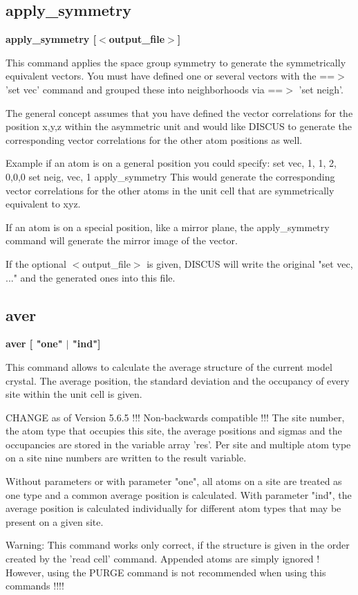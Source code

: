 \subsection*{apply\_symmetry}
{\bf apply\_symmetry [$ <$output\_file$> $] \par }
\par
\vspace{3pt}
This command applies the space group symmetry to generate the 
symmetrically equivalent vectors. You must have defined one or 
several vectors with the ==$> $ 'set vec' command and grouped 
these into neighborhoods via ==$> $ 'set neigh'. 
\par
The general concept assumes that you have defined the vector 
correlations for the position x,y,z within the asymmetric unit 
and would like DISCUS to generate the corresponding vector 
correlations for the other atom positions as well. 
\par
Example if an atom is on a general position you could specify: 
set vec, 1,  1, 2, 0,0,0 
set neig, vec, 1 
apply\_symmetry 
This would generate the corresponding vector correlations for 
the other atoms in the unit cell that are symmetrically 
equivalent to xyz. 
\par
If an atom is on a special position, like a mirror plane, the 
apply\_symmetry command will generate the mirror image of the 
vector. 
\par
\par
If the optional $ <$output\_file$> $ is given, DISCUS will write the 
original "set vec, ..." and the generated ones into this file. 
\subsection*{aver}
{\bf aver [ "one" $| $ "ind"] \par }
\par
\vspace{3pt}
This command allows to calculate the average structure of the current 
model crystal. The average position, the standard deviation and the 
occupancy of every site within the unit cell is given. 
\par
CHANGE as of Version 5.6.5 !!! Non-backwards compatible !!! 
The site number, the atom type that occupies this site, the average 
positions and sigmas and the occupancies are stored in the variable 
array 'res'. Per site and multiple atom type on a site nine numbers 
are written to the result variable. 
\par
Without parameters or with parameter "one", all atoms on a site are 
treated as one type and a common average position is calculated. 
With parameter "ind", the average position is calculated individually 
for different atom types that may be present on a given site. 
\par
\begin{MacVerbatim}
Warning: This command works only correct, if the structure is given
         in the order created by the 'read cell' command. Appended
         atoms are simply ignored ! However, using the PURGE command
         is not recommended when using this commands !!!!
\end{MacVerbatim}
